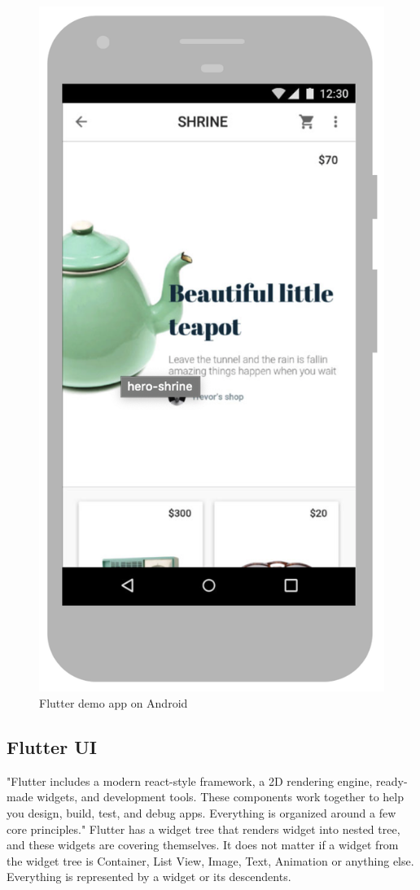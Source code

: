 \begin{figure}
\begin{minipage}{.45\textwidth}
        \includegraphics[width=.7\linewidth]{assets/hero-shrine-android.png}
        \caption{Flutter demo app on Android \cite{flutterTechnicalOverview}}
        \label{fig:flutter-demo-app-android}
    \end{minipage}
    \label{fig:flutter-demo-app}
\end{figure}


\subsection{Flutter UI}\label{subsec:flutter-ui}
"Flutter includes a modern react-style framework, a 2D rendering engine, ready-made widgets, and development tools.
These components work together to help you design, build, test, and debug apps.
Everything is organized around a few core principles."\cite{flutterTechnicalOverview}
Flutter has a widget tree that renders widget into nested tree, and these widgets are covering themselves.
It does not matter if a widget from the widget tree is Container, List View, Image, Text, Animation or anything else.
Everything is represented by a widget or its descendents.

